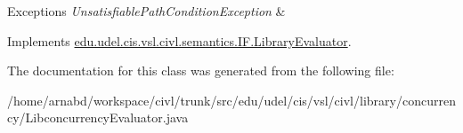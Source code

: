 \begin{DoxyExceptions}{Exceptions}
{\em Unsatisfiable\+Path\+Condition\+Exception} & \\
\hline
\end{DoxyExceptions}


Implements \hyperlink{interfaceedu_1_1udel_1_1cis_1_1vsl_1_1civl_1_1semantics_1_1IF_1_1LibraryEvaluator_a36d4bbd355cb9544feaaf0979280c70b}{edu.\+udel.\+cis.\+vsl.\+civl.\+semantics.\+I\+F.\+Library\+Evaluator}.



The documentation for this class was generated from the following file\+:\begin{DoxyCompactItemize}
\item 
/home/arnabd/workspace/civl/trunk/src/edu/udel/cis/vsl/civl/library/concurrency/Libconcurrency\+Evaluator.\+java\end{DoxyCompactItemize}
